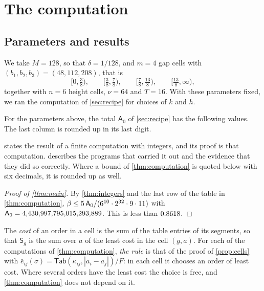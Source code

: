\section{The computation}\label{sec:computation}

\subsection{Parameters and results}

We take $M=128$, so that $\delta=1/128$, and $m=4$ gap cells with $(b_1,b_2,b_3)=(48,112,208)$, that is
\[
[0,\tfrac38),\qquad[\tfrac38,\tfrac78),\qquad[\tfrac78,\tfrac{13}{8}),\qquad[\tfrac{13}{8},\infty),
\]
together with $n=6$ height cells, $\nu=64$ and $T=16$. With these parameters fixed, we ran the computation of \cref{sec:recipe} for \ResultCountWord{} choices of $k$ and $h$.

\begin{thm}\label{thm:computation}
For the parameters above, the total $\mathsf{A}_0$ of \cref{sec:recipe} has the following values. The last column is rounded up in its last digit.
\begin{center}

\end{center}
\end{thm}

 states the result of a finite computation with integers, and its proof is that computation.  describes the programs that carried it out and the evidence that they did so correctly. Where a bound of \cref{thm:computation} is quoted below with six decimals, it is rounded up as well.

\begin{proof}[Proof of \cref{thm:main}]
By \cref{thm:integers} and the last row of the table in \cref{thm:computation}, $\beta\le5\,\mathsf{A}_0/(6^{10}\cdot2^{32}\cdot9\cdot11)$ with $\mathsf{A}_0=4{,}430{,}997{,}795{,}015{,}293{,}889$. This is less than $0.8618$.
\end{proof}

The \emph{cost} of an order in a cell is the sum of the table entries of its segments, so that $\mathsf{S}_g$ is the sum over $a$ of the least cost in the cell $(g,a)$. For each of the computations of \cref{thm:computation}, \emph{the rule} is that of the proof of \cref{prop:cells} with $\bar e_{ij}(\sigma)=\mathsf{Tab}(\kappa_{ij},|a_i-a_j|)/F$: in each cell it chooses an order of least cost. Where several orders have the least cost the choice is free, and \cref{thm:computation} does not depend on it.

